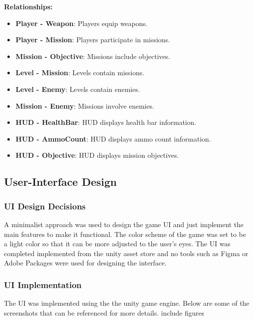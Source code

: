 \textbf{Relationships:}

\begin{itemize}
	\item \textbf{Player - Weapon}: Players equip weapons.
	\item \textbf{Player - Mission}: Players participate in missions.
	\item \textbf{Mission - Objective}: Missions include objectives.
	\item \textbf{Level - Mission}: Levels contain missions.
	\item \textbf{Level - Enemy}: Levels contain enemies.
	\item \textbf{Mission - Enemy}: Missions involve enemies.
	\item \textbf{HUD - HealthBar}: HUD displays health bar information.
	\item \textbf{HUD - AmmoCount}: HUD displays ammo count information.
	\item \textbf{HUD - Objective}: HUD displays mission objectives.
\end{itemize}

\subsection{User-Interface Design}
\subsubsection{UI Design Decisions}
A minimalist approach was used to design the game UI and just implement the main features to make it functional. The color scheme of the game was set to be a light color so that it can be more adjusted to the user's eyes. The UI was completed implemented from the unity asset store and no tools such as Figma or Adobe Packages were used for designing the interface.
\subsubsection{UI Implementation}
The UI was implemented using the the unity game engine. Below are some of the screenshots that can be referenced for more details.
include figures


